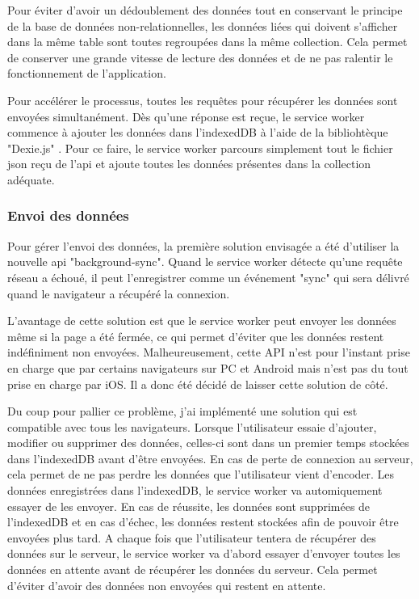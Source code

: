 \documentclass{EPL-master-thesis-covers-FR}
\begin{document}
					Pour éviter d'avoir un dédoublement des données tout en conservant le principe de la base de données non-relationnelles, les données liées qui doivent s'afficher dans la même table sont toutes regroupées dans la même collection. Cela permet de conserver une grande vitesse de lecture des données et de ne pas ralentir le fonctionnement de l'application.
							
					Pour accélérer le processus, toutes les requêtes pour récupérer les données sont envoyées simultanément. Dès qu'une réponse est reçue, le service worker commence à ajouter les données dans l'indexedDB à l'aide de la bibliohtèque "Dexie.js" \cite{ref:dexie}. Pour ce faire, le service worker parcours simplement tout le fichier \gls{json} reçu de l'\gls{api} et ajoute toutes les données présentes dans la collection adéquate.
				
				\subsubsection*{Envoi des données}
					Pour gérer l'envoi des données, la première solution envisagée a été d'utiliser la nouvelle \gls{api} "background-sync". Quand le service worker détecte qu'une requête réseau a échoué, il peut l'enregistrer comme un événement "sync" qui sera délivré quand le navigateur a récupéré la connexion. 
					
					L'avantage de cette solution est que le service worker peut envoyer les données même si la page a été fermée, ce qui permet d'éviter que les données restent indéfiniment non envoyées. Malheureusement, cette API n'est pour l'instant prise en charge que par certains navigateurs sur PC et Android mais n'est pas du tout prise en charge par iOS. Il a donc été décidé de laisser cette solution de côté.
					
					Du coup pour pallier ce problème, j'ai implémenté une solution qui est compatible avec tous les navigateurs. Lorsque l'utilisateur essaie d'ajouter, modifier ou supprimer des données, celles-ci sont dans un premier temps stockées dans l'indexedDB avant d'être envoyées. En cas de perte de connexion au serveur, cela permet de ne pas perdre les données que l'utilisateur vient d'encoder. Les données enregistrées dans l'indexedDB, le service worker va automiquement essayer de les envoyer. En cas de réussite, les données sont supprimées de l'indexedDB et en cas d'échec, les données restent stockées afin de pouvoir être envoyées plus tard. A chaque fois que l'utilisateur tentera de récupérer des données  sur le serveur, le service worker va d'abord essayer d'envoyer toutes les données en attente avant de récupérer les données du serveur. Cela permet d'éviter d'avoir des données non envoyées qui restent en attente.
					
\end{document}
